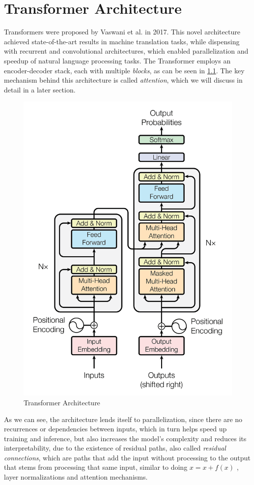 \chapter{Transformer Architecture}
Transformers \cite{attention_is_all_you_need} were proposed by Vaswani et al. in 2017. This novel architecture achieved state-of-the-art results in machine translation tasks, while dispensing with recurrent and convolutional architectures, which enabled parallelization and speedup of natural language processing tasks. The Transformer employs an encoder-decoder stack, each with multiple \emph{blocks}, as can be seen in \ref{fig:transformer}. The key mechanism behind this architecture is called \emph{attention}, which we will discuss in detail in a later section.

\begin{figure}[h]
    \centering
    \includegraphics[width=0.6\linewidth]{figs/transformer.png}
    \caption{Transformer Architecture \cite{attention_is_all_you_need}}
    \label{fig:transformer}
\end{figure}

As we can see, the architecture lends itself to parallelization, since there are no recurrences or dependencies between inputs, which in turn helps speed up training and inference, but also increases the model's complexity and reduces its interpretability, due to the existence of residual paths, also called \emph{residual connections}, which are paths that add the input without processing to the output that stems from processing that same input, similar to doing $x = x + f(x)$ , layer normalizations and attention mechanisms.

